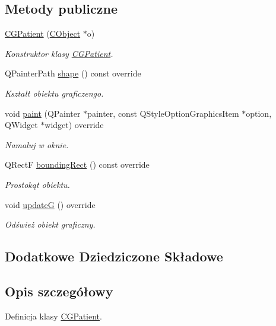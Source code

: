 \subsection*{Metody publiczne}
\begin{DoxyCompactItemize}
\item 
\mbox{\hyperlink{class_c_g_patient_a6403bb4f5eeac8d8da8e3cc5e7e8de1b}{C\+G\+Patient}} (\mbox{\hyperlink{class_c_object}{C\+Object}} $\ast$o)
\begin{DoxyCompactList}\small\item\em Konstruktor klasy \mbox{\hyperlink{class_c_g_patient}{C\+G\+Patient}}. \end{DoxyCompactList}\item 
Q\+Painter\+Path \mbox{\hyperlink{class_c_g_patient_a4f670563884de51aad9d35581e7e8025}{shape}} () const override
\begin{DoxyCompactList}\small\item\em Kształt obiektu graficzengo. \end{DoxyCompactList}\item 
void \mbox{\hyperlink{class_c_g_patient_a37695c047e8c5fb20e5d501e359f3344}{paint}} (Q\+Painter $\ast$painter, const Q\+Style\+Option\+Graphics\+Item $\ast$option, Q\+Widget $\ast$widget) override
\begin{DoxyCompactList}\small\item\em Namaluj w oknie. \end{DoxyCompactList}\item 
Q\+RectF \mbox{\hyperlink{class_c_g_patient_ae0150504523660b474078c309e2a8d3f}{bounding\+Rect}} () const override
\begin{DoxyCompactList}\small\item\em Prostokąt obiektu. \end{DoxyCompactList}\item 
void \mbox{\hyperlink{class_c_g_patient_af491f55054cfd0288fb2b052dd434c33}{updateG}} () override
\begin{DoxyCompactList}\small\item\em Odśwież obiekt graficzny. \end{DoxyCompactList}\end{DoxyCompactItemize}
\subsection*{Dodatkowe Dziedziczone Składowe}


\subsection{Opis szczegółowy}
Definicja klasy \mbox{\hyperlink{class_c_g_patient}{C\+G\+Patient}}. 

